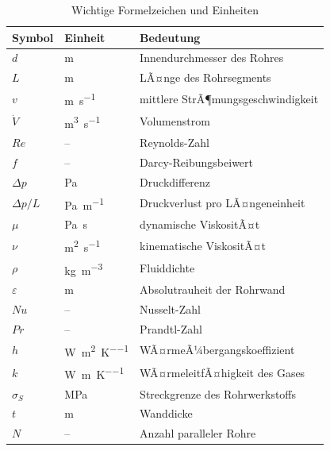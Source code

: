 ﻿\documentclass[12pt,a4paper,twoside]{article}
\theoremstyle{plain}
\theoremstyle{definition}
\theoremstyle{remark}
\newcommand{\Rey}{\mathit{Re}}
\newcommand{\Nus}{\mathit{Nu}}
\newcommand{\Pra}{\mathit{Pr}}
\newcommand{\dpL}{\Delta p / L}
\begin{document}
\begin{table}[htbp]
\centering
\caption{Wichtige Formelzeichen und Einheiten}
\label{tab:nomenklatur}
\begin{tabularx}{\linewidth}{@{}llX@{}}
\toprule
Symbol & Einheit & Bedeutung \\
\midrule
$d$     & \si{\metre}                 & Innendurchmesser des Rohres \\
$L$     & \si{\metre}                 & LÃ¤nge des Rohrsegments \\
$v$     & \si{\metre\per\second}      & mittlere StrÃ¶mungsgeschwindigkeit \\
$\dot{V}$ & \si{\metre\cubed\per\second} & Volumenstrom \\
$\Rey$  & --                          & Reynolds-Zahl \\
$f$     & --                          & Darcy-Reibungsbeiwert \\
$\Delta p$ & \si{\pascal}            & Druckdifferenz \\
$\dpL$  & \si{\pascal\per\metre}      & Druckverlust pro LÃ¤ngeneinheit \\
$\mu$   & \si{\pascal\second}         & dynamische ViskositÃ¤t \\
$\nu$   & \si{\metre\squared\per\second} & kinematische ViskositÃ¤t \\
$\rho$  & \si{\kilogram\per\metre\cubed} & Fluiddichte \\
$\varepsilon$ & \si{\metre}          & Absolutrauheit der Rohrwand \\
$\Nus$  & --                          & Nusselt-Zahl \\
$\Pra$  & --                          & Prandtl-Zahl \\
$h$     & \si{\watt\per\metre\squared\per\kelvin} & WÃ¤rmeÃ¼bergangskoeffizient \\
$k$     & \si{\watt\per\metre\per\kelvin}  & WÃ¤rmeleitfÃ¤higkeit des Gases \\
$\sigma_S$ & \si{\mega\pascal}        & Streckgrenze des Rohrwerkstoffs \\
$t$     & \si{\metre}                 & Wanddicke \\
$N$     & --                          & Anzahl paralleler Rohre \\
\bottomrule
\end{tabularx}
\end{table}
\end{document}
